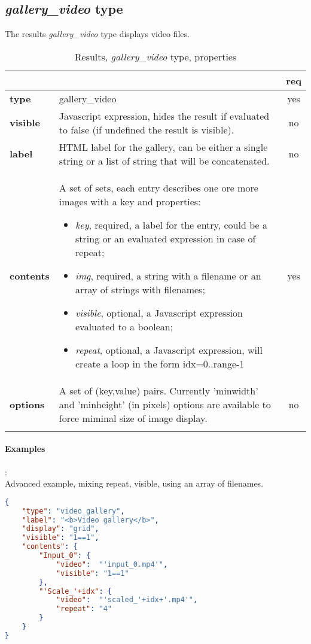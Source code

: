 \subsection{ \emph{gallery\_video} type}

The results \emph{gallery\_video} type displays video files.

\begin{longtable}{|>{\bf}L{\linewidth}|L{\linewidth}|c|}
\hline
      &  & {\bf req} 
\tabularnewline \hline \hline
 type       & gallery\_video  & yes \\ \hline
 visible    & Javascript expression, hides the result if
              evaluated to false (if undefined the result is visible).& no \\ \hline
 label      & HTML label for the gallery, can be either a single string or 
             a list of string that will be concatenated. & no \\ \hline
 contents   & A set of sets, each entry describes one ore more images with a key and properties:
\vspace{-1em}
\begin{itemize}
    \setlength\itemsep{-0.5em}
    \item \textit{key}, required, a label for the entry, could be a string or an evaluated expression in case of repeat;
    \item \textit{img}, required, a string with a filename or an array of strings with filenames;
    \item \textit{visible}, optional, a Javascript expression evaluated to a boolean;
    \item \textit{repeat}, optional, a Javascript expression, will create a loop in the form idx=0..range-1
\end{itemize} 
\vspace{-1em} & yes \\ \hline
 options    & A set of (key,value) pairs. Currently
              'minwidth' and 'minheight' (in pixels) options are available to force
              miminal size of image display. & no \\ \hline
\caption{Results, \emph{gallery\_video} type, properties}
\end{longtable}

\paragraph{Examples}:\\
Advanced example, mixing repeat, visible, using an array of filenames.
\begin{lstlisting}[language=json,firstnumber=1]
{
    "type": "video_gallery",
    "label": "<b>Video gallery</b>",
    "display": "grid",
    "visible": "1==1",
    "contents": {
        "Input_0": {
            "video":  "'input_0.mp4'",
            "visible": "1==1"
        },
        "'Scale_'+idx": {
            "video":  "'scaled_'+idx+'.mp4'",
            "repeat": "4"
        }
    }
}
\end{lstlisting}



